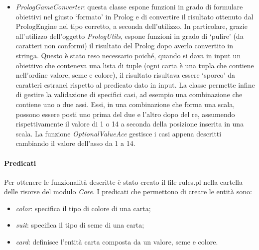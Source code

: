 \begin{itemize}
    \item \textit{PrologGameConverter}: questa classe espone funzioni in grado di formulare obiettivi nel giusto ‘formato’ in Prolog e di convertire il risultato ottenuto dal PrologEngine nel tipo corretto, a seconda dell’utilizzo. In particolare, grazie all’utilizzo dell’oggetto \textit{PrologUtils}, espone funzioni in grado di ‘pulire’ (da caratteri non conformi) il risultato del Prolog dopo averlo convertito in stringa. Questo è stato reso necessario poiché, quando si dava in input un obiettivo che conteneva una lista di tuple (ogni carta è una tupla che contiene nell’ordine valore, seme e colore), il risultato risultava essere ‘sporco’ da caratteri estranei rispetto al predicato dato in input.
    La classe permette infine di gestire la validazione di specifici casi, ad esempio  una combinazione che contiene uno o due assi. Essi, in una combinazione che forma una scala, possono essere posti uno prima del due e l’altro dopo del re, assumendo rispettivamente il valore di 1 o 14 a seconda della posizione inserita in una scala. La funzione \textit{OptionalValueAce} gestisce i casi appena descritti cambiando il valore dell’asso da 1 a 14.
\end{itemize}

\paragraph{Predicati}
Per ottenere le funzionalità descritte è stato creato il file rules.pl nella cartella delle risorse del modulo \textit{Core}.
\newline
I predicati che permettono di creare le entità sono:
\begin{itemize}
    \item \textit{color}: specifica il tipo di colore di una carta;
    \item \textit{suit}: specifica il tipo di seme di una carta;
    \item \textit{card}: definisce l’entità carta composta da un valore, seme e colore.
\end{itemize}

